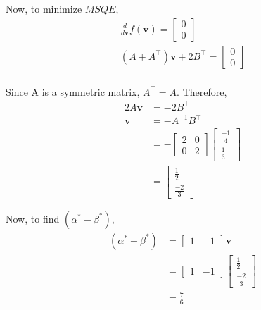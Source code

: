 \documentclass[]{article}
\begin{document}
Now, to minimize $MSQE$,
\begin{align}
    \frac{d}{d \mathbf{v}} f(\mathbf{v}) = 
    \begin{bmatrix}
        0\\
        0
    \end{bmatrix} \\
    (A+A^\intercal)\mathbf{v} + 2B^\intercal = 
    \begin{bmatrix}
        0\\
        0
    \end{bmatrix} \\
\end{align}

Since A is a symmetric matrix, $A^\intercal = A$. Therefore, 
\begin{align}
    2A \mathbf{v} &= -2B^\intercal \\
    \mathbf{v} &= -A^{-1}B^\intercal \\
    &= -
    \begin{bmatrix}
        2 & 0\\
        0 & 2
    \end{bmatrix}
    \begin{bmatrix}
        \frac{-1}{4} \\
        \frac{1}{3}
    \end{bmatrix} \\
    &= 
    \begin{bmatrix}
        \frac{1}{2}\\
        \frac{-2}{3} 
    \end{bmatrix}
\end{align}

Now, to find $(\alpha ^* - \beta ^*)$, 
\begin{align}
    (\alpha ^* - \beta ^*) &= 
    \begin{bmatrix}
        1 & -1
    \end{bmatrix} \mathbf{v} \\
    &= 
    \begin{bmatrix}
        1 & -1
    \end{bmatrix}
    \begin{bmatrix}
        \frac{1}{2} \\
        \frac{-2}{3}
    \end{bmatrix} \\
    &= \frac{7}{6}
\end{align}
\end{document}
